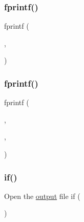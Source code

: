 \subsubsection{\texorpdfstring{fprintf()}{fprintf()}\hspace{0.1cm}{\footnotesize\ttfamily [2/3]}}
{\footnotesize\ttfamily fprintf (\begin{DoxyParamCaption}\item[{1}]{,  }\item[{\textquotesingle{}\hyperlink{a00623_a781a04ab095280f838ff3eb0e51312e0}{T\+H\+R\+E\+E\+D\+\_\+\+T\+O\+\_\+\+V\+T\+U\textbackslash{}n}\textquotesingle{}}]{ }\end{DoxyParamCaption})}

\mbox{\label{a00614_a133635719affbdef46ee70cd6d8d19de}} 
\subsubsection{\texorpdfstring{fprintf()}{fprintf()}\hspace{0.1cm}{\footnotesize\ttfamily [3/3]}}
{\footnotesize\ttfamily fprintf (\begin{DoxyParamCaption}\item[{1}]{,  }\item[{\textquotesingle{} Data written to \char`\"{}\%s\char`\"{}\textbackslash{}n\textquotesingle{}}]{,  }\item[{\hyperlink{a00617_a5934d690c688edbd92210f38fe5855e7}{output\+\_\+filename}}]{ }\end{DoxyParamCaption})}

\mbox{\label{a00614_a96c738d3e2120c4273f9d4390761d99e}} 
\subsubsection{\texorpdfstring{if()}{if()}}
{\footnotesize\ttfamily Open the \hyperlink{a00623_a934120182a1459d17613528940e2bc61}{output} file if (\begin{DoxyParamCaption}\item[{\hyperlink{a00608_ad2a182e2e8932167c056732723f13e1c}{isempty}(\hyperlink{a00617_a5934d690c688edbd92210f38fe5855e7}{output\+\_\+filename})}]{ }\end{DoxyParamCaption})}

